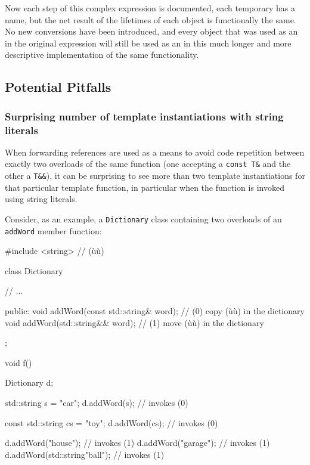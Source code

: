 \noindent Now each step of this complex expression is documented, each temporary
has a name, but the net result of the lifetimes of each object is
functionally the same. No new conversions have been introduced, and
every object that was used as an  in the original
expression will still be used as an  in this much longer
and more descriptive implementation of the same functionality.

\subsection[Potential Pitfalls]{Potential Pitfalls}\label{potential-pitfalls}

\subsubsection[Surprising number of template instantiations with string literals]{Surprising number of template instantiations with string literals}\label{surprising-number-of-template-instantiations-with-string-literals}

When forwarding references are used as a means to avoid code repetition
between exactly two overloads of the same function (one accepting a
\lstinline!const!~\lstinline!T&! and the other a \lstinline!T&&!), it can be
surprising to see more than two template instantiations for that
particular template function, in particular when the function is invoked
using string literals.

Consider, as an example, a \lstinline!Dictionary! class containing two
overloads of an \lstinline!addWord! member function:
\begin{emcppshiddenlisting}[emcppsbatch={e15,e16}]
#include <string>  // (ù{}ù)
\end{emcppshiddenlisting}
\begin{emcppslisting}[emcppsbatch=e15]
class Dictionary
{
    // ...

public:
    void addWord(const std::string& word);  // (0) copy (ù{}ù) in the dictionary
    void addWord(std::string&& word);       // (1) move (ù{}ù) in the dictionary
};

void f()
{
    Dictionary d;

    std::string s = "car";
    d.addWord(s);                    // invokes (0)

    const std::string cs = "toy";
    d.addWord(cs);                   // invokes (0)

    d.addWord("house");              // invokes (1)
    d.addWord("garage");             // invokes (1)
    d.addWord(std::string{"ball"});  // invokes (1)
}
\end{emcppslisting}

